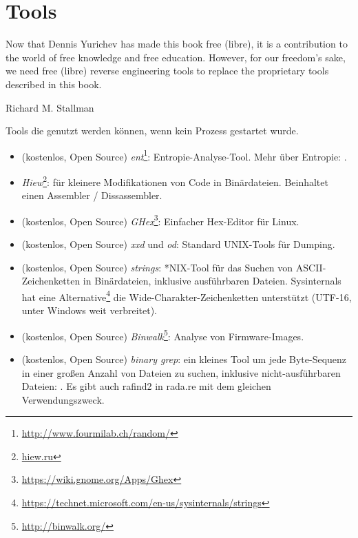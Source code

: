 \chapter{Tools}

\epigraph{Now that Dennis Yurichev has made this book free (libre), it is a
contribution to the world of free knowledge and free education.
However, for our freedom's sake, we need free (libre) reverse
engineering tools to replace the proprietary tools described in this book.}{Richard M. Stallman}


Tools die genutzt werden können, wenn kein Prozess gestartet wurde.


\begin{itemize}
\item
(kostenlos, Open Source) \emph{ent}\footnote{\url{http://www.fourmilab.ch/random/}}: Entropie-Analyse-Tool.
Mehr über Entropie: .

\item
\label{Hiew}
\emph{Hiew}\footnote{\href{http://www.hiew.ru/}{hiew.ru}}:
für kleinere Modifikationen von Code in Binärdateien.
Beinhaltet einen Assembler / Dissassembler.

\item (kostenlos, Open Source) \emph{GHex}\footnote{\url{https://wiki.gnome.org/Apps/Ghex}}: Einfacher Hex-Editor für Linux.

\item (kostenlos, Open Source) \emph{xxd} und \emph{od}: Standard UNIX-Tools für Dumping.

\item (kostenlos, Open Source) \emph{strings}: *NIX-Tool für das Suchen von ASCII-Zeichenketten in Binärdateien,
inklusive ausführbaren Dateien.
Sysinternals hat eine Alternative\footnote{\url{https://technet.microsoft.com/en-us/sysinternals/strings}}
die Wide-Charakter-Zeichenketten unterstützt (UTF-16, unter Windows weit verbreitet).

\item (kostenlos, Open Source) \emph{Binwalk}\footnote{\url{http://binwalk.org/}}: Analyse von Firmware-Images.

\item
{}
(kostenlos, Open Source) \emph{binary grep}:
ein kleines Tool um jede Byte-Sequenz in einer großen Anzahl von Dateien zu suchen,
inklusive nicht-ausführbaren Dateien: \BGREPURL.
Es gibt auch rafind2 in rada.re mit dem gleichen Verwendungszweck.
\end{itemize}

